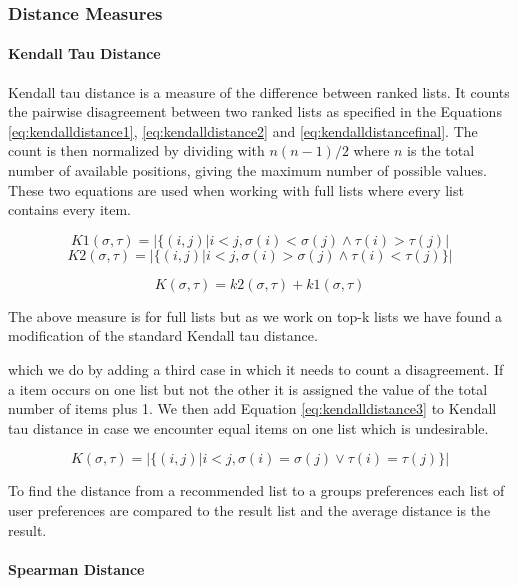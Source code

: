 \subsubsection{Distance Measures}

\paragraph{Kendall Tau Distance}
Kendall tau distance is a measure of the difference between ranked lists\citep{rank:aggregation}. It counts the pairwise disagreement between two ranked lists as specified in the Equations \ref{eq:kendalldistance1}, \ref{eq:kendalldistance2} and \ref{eq:kendalldistancefinal}. The count is then normalized by dividing with $n(n-1)/2$ where $n$ is the total number of available positions, giving the maximum number of possible values. 
These two equations are used when working with full lists where every list contains every item. 

\begin{equation}\label{eq:kendalldistance1}
K1(\sigma,\tau) = | \{(i,j) | i < j, \sigma (i) < \sigma (j) \land \tau (i) > \tau (j)|
\end{equation}
\begin{equation}\label{eq:kendalldistance2}
K2(\sigma,\tau) = | \{(i,j) | i < j, \sigma (i) > \sigma (j) \land \tau (i) < \tau (j) \} |
\end{equation}

\begin{equation}\label{eq:kendalldistancefinal}
K(\sigma,\tau) = k2(\sigma,\tau) + k1(\sigma,\tau)
\end{equation}

The above measure is for full lists but as we work on top-k lists we have found a modification of the standard Kendall tau distance\cite{comparing:topk}. 

 which we do by adding a third case in which it needs to count a disagreement. If a item occurs on one list but not the other it is assigned the value of the total number of items plus 1. We then add Equation \ref{eq:kendalldistance3} to Kendall tau distance in case we encounter equal items on one list which is undesirable.

\begin{equation}\label{eq:kendalldistance3}
K(\sigma,\tau) = | \{(i,j) | i < j, \sigma (i) = \sigma (j) \lor \tau (i) = \tau (j) \} |
\end{equation}

To find the distance from a recommended list to a groups preferences each list of user preferences are compared to the result list and the average distance is the result. 



\paragraph{Spearman Distance}